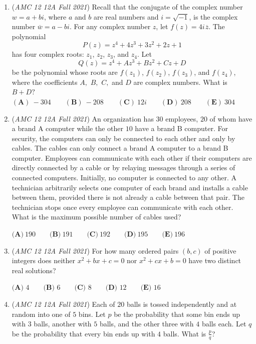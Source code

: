 \begin{enumerate}
	\item (\textit{AMC 12 12A Fall 2021}) Recall that the conjugate of the complex number $w = a + bi$, where $a$ and $b$ are real numbers and $i = \sqrt{-1}$, is the complex number $\overline{w} = a - bi$. For any complex number $z$, let $f(z) = 4i\hspace{1pt}\overline{z}$. The polynomial 
 \[P(z) = z^4 + 4z^3 + 3z^2 + 2z + 1\] has four complex roots: $z_1$, $z_2$, $z_3$, and $z_4$. Let 
 \[Q(z) = z^4 + Az^3 + Bz^2 + Cz + D\] be the polynomial whose roots are $f(z_1)$, $f(z_2)$, $f(z_3)$, and $f(z_4)$, where the coefficients $A,$ $B,$ $C,$ and $D$ are complex numbers. What is $B + D?$
$(\textbf{A})\: {-}304\qquad(\textbf{B}) \: {-}208\qquad(\textbf{C}) \: 12i\qquad(\textbf{D}) \: 208\qquad(\textbf{E}) \: 304$


	\item (\textit{AMC 12 12A Fall 2021}) An organization has $30$ employees, $20$ of whom have a brand A computer while the other $10$ have a brand B computer. For security, the computers can only be connected to each other and only by cables. The cables can only connect a brand A computer to a brand B computer. Employees can communicate with each other if their computers are directly connected by a cable or by relaying messages through a series of connected computers. Initially, no computer is connected to any other. A technician arbitrarily selects one computer of each brand and installs a cable between them, provided there is not already a cable between that pair. The technician stops once every employee can communicate with each other. What is the maximum possible number of cables used?


 $\textbf{(A)}\ 190  \qquad\textbf{(B)}\  191 \qquad\textbf{(C)}\  192 \qquad\textbf{(D)}\  195 \qquad\textbf{(E)}\ 196$


	\item (\textit{AMC 12 12A Fall 2021}) For how many ordered pairs $(b,c)$ of positive integers does neither $x^2+bx+c=0$ nor $x^2+cx+b=0$ have two distinct real solutions?


 $\textbf{(A) } 4 \qquad \textbf{(B) } 6 \qquad \textbf{(C) } 8 \qquad \textbf{(D) } 12 \qquad \textbf{(E) } 16 \qquad$


	\item (\textit{AMC 12 12A Fall 2021}) Each of $20$ balls is tossed independently and at random into one of $5$ bins. Let $p$ be the probability that some bin ends up with $3$ balls, another with $5$ balls, and the other three with $4$ balls each. Let $q$ be the probability that every bin ends up with $4$ balls. What is $\frac{p}{q}$?



\end{enumerate}
